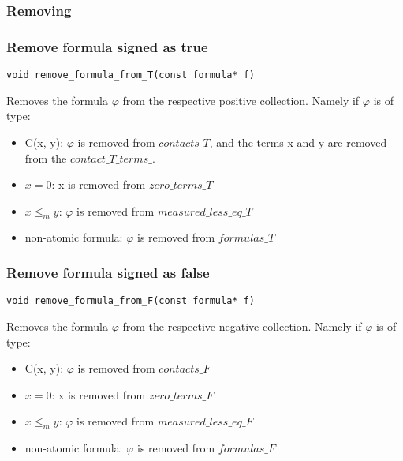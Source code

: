 \documentclass{article}
\begin{document}
	\subsubsection*{Removing}
	\subsubsection*{Remove formula signed as true}
\begin{lstlisting}
void remove_formula_from_T(const formula* f)
\end{lstlisting}
	Removes the formula $\varphi$ from the respective positive collection. Namely if $\varphi$ is of type:
	\begin{itemize}
		\item C(x, y): $\varphi$ is removed from $contacts\_T$, and the terms x and y are removed from the $contact\_T\_terms\_$.
		\item $x = 0$: x is removed from $zero\_terms\_T$
		\item $x \le_m y$: $\varphi$ is removed from $measured\_less\_eq\_T$
		\item non-atomic formula: $\varphi$ is removed from $formulas\_T$
	\end{itemize}

	\subsubsection*{Remove formula signed as false}
\begin{lstlisting}
void remove_formula_from_F(const formula* f)
\end{lstlisting}
	Removes the formula $\varphi$ from the respective negative collection. Namely if $\varphi$ is of type:
	\begin{itemize}
		\item C(x, y): $\varphi$ is removed from $contacts\_F$
		\item $x = 0$: x is removed from $zero\_terms\_F$
		\item $x \le_m y$: $\varphi$ is removed from $measured\_less\_eq\_F$
		\item non-atomic formula: $\varphi$ is removed from $formulas\_F$
	\end{itemize}

	\newpage
\end{document}
